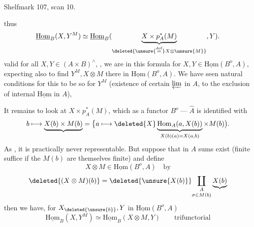 Shelfmark 107, scan 10.

thus
\[
\underline{\mathrm{Hom}}_B(X,Y^M)\simeq\underline{\mathrm{Hom}}_B(\underbrace{X\times p_A^*(M)}_{\deleted{\unsure{\mathop{=}\limits^{\mathrm{def}}}X\otimes\unsure{M}}},Y).
\]
 valid for all $X,Y\in(A\times B)^\wedge$, , we are  in this formula for $X,Y\in\underline{\mathrm{Hom}}(B^o,A)$, expecting also to find $Y^M,X\otimes M$ there in $\underline{\mathrm{Hom}}(B^o,A)$. We have seen natural conditions for this to be so for $Y^M$ (existence of certain $\varprojlim$ in $A$, to the exclusion of internal $\underline{\mathrm{Hom}}$ in $A$),

It remains to look at $X\times p_A^*(M)$, which as a functor $B^o\mathbin{\text{---}}\widehat A$ is identified with
\[
b\longmapsto\underbrace{X(b)\times M(b)}=\bigl\{a\longmapsto\deleted{X}\underbrace{\mathrm{Hom}_A(a,X(b))}_{X(b)(a)=X(a,b)}\times M(b)\bigr).
\]
As , it is practically never representable. But suppose that in $A$ sums exist (finite  suffice if the $M(b)$ are themselves finite) and define
\[
X\otimes M\in\underline{\mathrm{Hom}}(B^o,A)\quad\text{by}
\]
\[
\deleted{(X\otimes M)(b)}=\deleted{\unsure{X(b)}}\underset{\sigma\in M(b)}{\coprod_A}\underbrace{X(b)}
\]
then we have, for $X_{\deleted{\unsure{b}}},Y$ in $\underline{\mathrm{Hom}}(B^o,A)$
\[
\underline{\mathrm{Hom}}_B(X,Y^M)\simeq\underline{\mathrm{Hom}}_B(X\otimes M,Y)\qquad\text{trifunctorial}
\]
